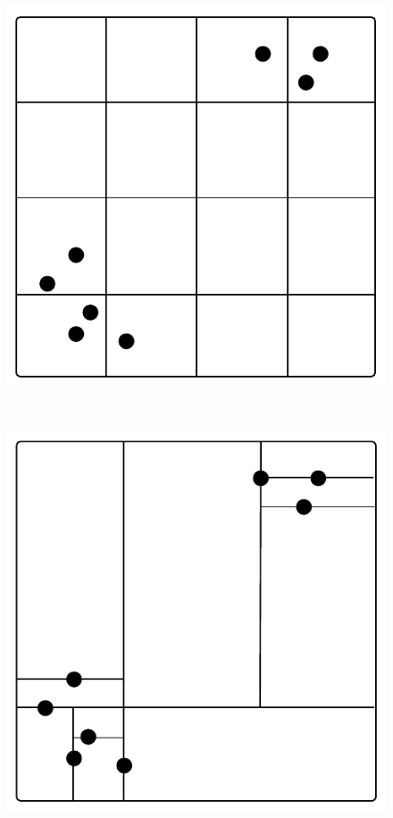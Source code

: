 \begin{figure}
	\begin{center}
		\begin{subfloat}{%
			\includegraphics[scale=0.4]{figures/quadtree_clustered.pdf}
		}
		\end{subfloat}~~~~~
		\begin{subfloat}{%
			\includegraphics[scale=0.4]{figures/kdtree_clustered.pdf}
		}

\end{subfloat}
\end{center}
\end{figure}
